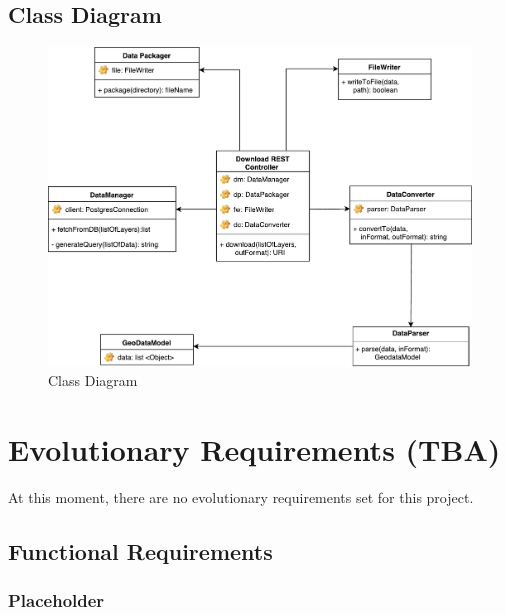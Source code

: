 \documentclass{article}
\begin{document}
\clearpage

\subsection{Class Diagram}

\begin{figure}[H]
	\begin{center}
		\caption{Class Diagram}
		\label{class-diagram}
		\includegraphics[width=\textwidth]{images/class_diagram.pdf}
	\end{center}
\end{figure}

\clearpage

\section{Evolutionary Requirements (TBA)}

At this moment, there are no evolutionary requirements set for this project.

\subsection{Functional Requirements}


\subsubsection{Placeholder}
\end{document}
